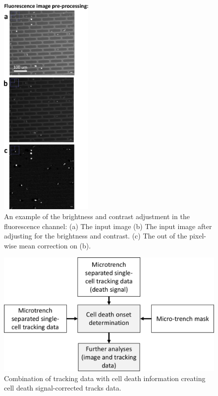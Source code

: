 \documentclass[pdftex,12pt,a4paper]{report}
\begin{document}
\begin{figure}[p]
   \centering
    \includegraphics[width=0.4\textwidth]{images/pipeline/02-02.pdf}
    \caption[Fluorescence channel image pre-processing pipeline]{An example of the brightness and contrast adjustment in the fluorescence channel: (a) The input image (b) The input image after adjusting for the brightness and  contrast. (c) The out of the pixel-wise mean correction on (b).}
\end{figure}
\label{fig:pipeline22}

\begin{figure}[H]
   \centering
    \includegraphics[width=.6\textwidth]{images/pipeline/03.pdf}
    \caption[Combination of tracking data with cell death information creating cell death signal-corrected tracks data]{Combination of tracking data with cell death information creating cell death signal-corrected tracks data.}
    \label{fig:pipeline3}
\end{figure}
\end{document}
